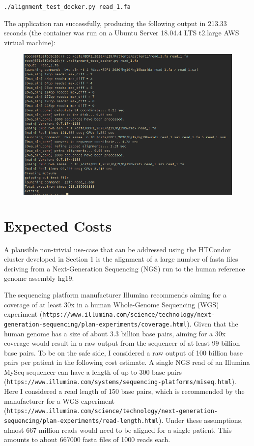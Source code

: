 \documentclass{article}
\begin{document}
\begin{lstlisting}
./alignment_test_docker.py read_1.fa
\end{lstlisting}

The application ran successfully, producing the following output in 213.33 seconds (the container was run on a Ubuntu Server 18.04.4 LTS t2.large AWS virtual machine):

\begin{figure}[!h]
    \center
    \includegraphics[width=\textwidth]{./images/docker_test_out.png}
\end{figure}

\FloatBarrier

\section{Expected Costs}
A plausible non-trivial use-case that can be addressed using the HTCondor cluster developed in Section 1 is the alignment of a large number of fasta files deriving from a Next-Generation Sequencing (NGS) run to the human reference genome assembly hg19.

The sequencing platform manufacturer Illumina recommends aiming for a coverage of at least 30x in a human Whole-Genome Sequencing (WGS) experiment (\texttt{https://www.illumina.com/science/technology/next-generation-sequencing/plan-experiments/coverage.html}).
Given that the human genome has a size of about 3.3 billion base pairs, aiming for a 30x coverage would result in a raw output from the sequencer of at least 99 billion base pairs.
To be on the safe side, I considered a raw output of 100 billion base pairs per patient in the following cost estimate.
A single NGS read of an Illumina MySeq sequencer can have a length of up to 300 base pairs (\texttt{https://www.illumina.com/systems/sequencing-platforms/miseq.html}). Here I considered a read length of 150 base pairs, which is recommended by the manufacturer for a WGS experiment (\texttt{https://www.illumina.com/science/technology/next-generation-sequencing/plan-experiments/read-length.html}).
Under these assumptions, almost 667 million reads would need to be aligned for a single patient.
This amounts to about 667000 fasta files of 1000 reads each.
\end{document}
